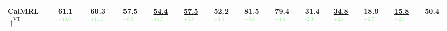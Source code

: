 \begin{table}[t]
\begin{adjustbox}{width=\textwidth,center}
\begin{tabular}{@{}l|ll|ll|ll|ll|ll|ll|c@{}}
 \midrule
\textbf{CalMRL$\uparrow^{\text{VT}}$}   & \textbf{61.1\textcolor{lightgreen}{$^\text{+10.6}$}}           & \textbf{60.3\textcolor{lightgreen}{$^\text{+11.3}$}}          & \textbf{57.5\textcolor{lightgreen}{$^\text{+8.9}$}}           & \underline{54.4}\textcolor{lightgreen}{$^\text{+7.5}$}           & \underline{57.5}\textcolor{lightgreen}{$^\text{+5.8}$}           & 52.2\textcolor{lightgreen}{$^\text{+3.4}$}           & \textbf{81.5\textcolor{lightgreen}{$^\text{+5.6}$}}           & \textbf{79.4\textcolor{lightgreen}{$^\text{+4.6}$}}           & 31.4\textcolor{lightgreen}{$^\text{-2.3}$}            & \underline{34.8}\textcolor{lightgreen}{$^\text{+2.6}$}            & \textbf{18.9\textcolor{lightgreen}{$^\text{+6.5}$}}           & \underline{15.8}\textcolor{lightgreen}{$^\text{+2.8}$}       & \textbf{50.4}    \\
 \bottomrule
\end{tabular}
\end{adjustbox}
\end{table}

